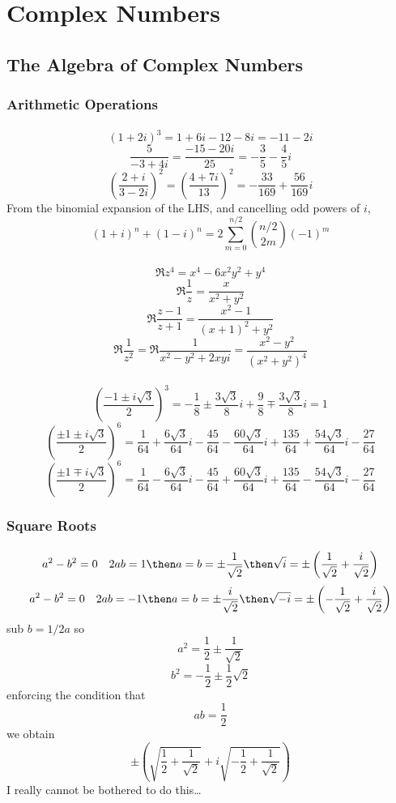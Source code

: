 \chapter{Complex Numbers}\label{ch:complex}
\section{The Algebra of Complex Numbers}
\subsection{Arithmetic Operations}
\subsubsection{}
\[(1+2i)^3 = 1+6i - 12-8i = \boxed{-11-2i}\]
\[\frac{5}{-3+4i} = \frac{-15-20i}{25} = \boxed{-\frac{3}{5}-\frac{4}{5}i}\]
\[\left(\frac{2+i}{3-2i}\right)^2 = \left(\frac{4+7i}{13}\right)^2=\boxed{-\frac{33}{169}+ \frac{56}{169}i}\]
From the binomial expansion of the LHS, and cancelling odd powers of \(i\),
\[(1+i)^n+(1-i)^n=2\sum_{m=0}^{n/2} \binom{n/2}{2m}(-1)^m\]
\subsubsection{}
\[\Re{z^4} = x^4-6x^2y^2+y^4\]
\[\Re\frac1z=\frac{x}{x^2+y^2}\]
\[\Re\frac{z-1}{z+1} = \frac{x^2-1}{(x+1)^2+y^2}\]
\[\Re\frac{1}{z^2} = \Re\frac{1}{x^2-y^2+2xyi}=\frac{x^2-y^2}{(x^2+y^2)^4}\]
\subsubsection{}
\[\left(\frac{-1\pm i \sqrt{3}}{2}\right)^3 = -\frac{1}{8}\pm \frac{3\sqrt{3}}{8}i+\frac{9}{8}\mp\frac{3\sqrt{3}}{8}i=1\]
\[\left(\frac{\pm1\pm i\sqrt{3}}{2}\right)^6=\frac{1}{64}+\frac{6\sqrt{3}}{64}i-\frac{45}{64}-\frac{60\sqrt{3}}{64}i+\frac{135}{64}+\frac{54\sqrt{3}}{64}i-\frac{27}{64}\]
\[\left(\frac{\pm1\mp i\sqrt{3}}{2}\right)^6=\frac{1}{64}-\frac{6\sqrt{3}}{64}i-\frac{45}{64}+\frac{60\sqrt{3}}{64}i+\frac{135}{64}-\frac{54\sqrt{3}}{64}i-\frac{27}{64}\]
\subsection{Square Roots}
\subsubsection{}
\[a^2-b^2=0\quad 2ab=1\then a=b=\pm\frac{1}{\sqrt{2}}\then \sqrt{i} = \pm\left(\frac{1}{\sqrt{2}}+\frac{i}{\sqrt{2}}\right)\]
\[a^2-b^2=0\quad 2ab=-1\then a=b=\pm\frac{i}{\sqrt{2}}\then \sqrt{-i} = \pm \left(-\frac{1}{\sqrt{2}}+\frac{i}{\sqrt{2}}\right)\]
sub \(b=1/2a\) so
\[a^2 = \frac{1}{2}\pm\frac{1}{\sqrt{2}}\]
\[b^2 = -\frac{1}{2}\pm\frac{1}{2}\sqrt{2}\]
enforcing the condition that
\[ab = \frac{1}{2}\]
we obtain
\[\pm \left(\sqrt{\frac{1}{2}+\frac{1}{\sqrt{2}}}+i\sqrt{-\frac{1}{2}+\frac{1}{\sqrt{2}}}\right)\]
I really cannot be bothered to do this\ldots
